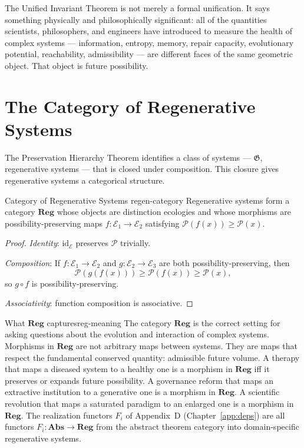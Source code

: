 \documentclass[12pt,twoside,openright]{book}
\begin{document}
\noindent
The Unified Invariant Theorem is not merely a formal
unification. It says something physically and
philosophically significant: all of the quantities
scientists, philosophers, and engineers have introduced
to measure the health of complex systems —
information, entropy, memory, repair capacity,
evolutionary potential, reachability, admissibility —
are different faces of the same geometric object.
That object is future possibility.

\section{The Category of Regenerative Systems}
\label{sec:ch30-category}

The Preservation Hierarchy Theorem identifies a class
of systems — $\mathfrak{G}$, regenerative systems —
that is closed under composition. This closure gives
regenerative systems a categorical structure.

\begin{theorem}{Category of Regenerative Systems}%
  {regen-category}
  Regenerative systems form a category $\mathbf{Reg}$
  whose objects are distinction ecologies and whose
  morphisms are possibility-preserving maps
  $f: \mathcal{E}_1 \to \mathcal{E}_2$ satisfying
  $\mathcal{P}(f(x)) \ge \mathcal{P}(x)$.
\end{theorem}

\begin{proof}
  \textit{Identity}: $\mathrm{id}_\mathcal{E}$ preserves
  $\mathcal{P}$ trivially.

  \textit{Composition}: If $f: \mathcal{E}_1 \to
  \mathcal{E}_2$ and $g: \mathcal{E}_2 \to \mathcal{E}_3$
  are both possibility-preserving, then
  \[
    \mathcal{P}(g(f(x)))
    \ge \mathcal{P}(f(x))
    \ge \mathcal{P}(x),
  \]
  so $g \circ f$ is possibility-preserving.

  \textit{Associativity}: function composition
  is associative.
\end{proof}

\begin{remark}{What $\mathbf{Reg}$ captures}{reg-meaning}
  The category $\mathbf{Reg}$ is the correct setting
  for asking questions about the evolution and
  interaction of complex systems.
  Morphisms in $\mathbf{Reg}$ are not arbitrary maps
  between systems. They are maps that respect the
  fundamental conserved quantity: admissible future
  volume.
  A therapy that maps a diseased system to a healthy
  one is a morphism in $\mathbf{Reg}$ iff it preserves
  or expands future possibility.
  A governance reform that maps an extractive
  institution to a generative one is a morphism in
  $\mathbf{Reg}$.
  A scientific revolution that maps a saturated paradigm
  to an enlarged one is a morphism in $\mathbf{Reg}$.
  The realization functors $F_i$ of Appendix~D
  (Chapter~\ref{app:deps}) are all functors
  $F_i: \mathbf{Abs} \to \mathbf{Reg}$ from the
  abstract theorem category into domain-specific
  regenerative systems.
\end{remark}
\end{document}
